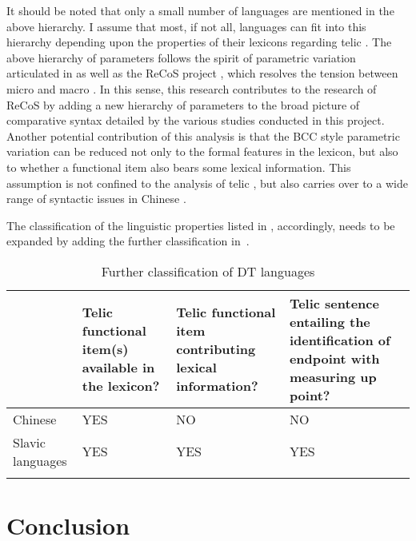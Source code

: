 \documentclass[output=paper]{langsci/langscibook}
\begin{document}
It should be noted that only a small number of languages are mentioned in the
above hierarchy. I assume that most, if not all, languages can fit into this
hierarchy depending upon the properties of their
lexicons regarding telic . The above hierarchy of
parameters follows the spirit of parametric variation articulated in
\textcite{RobHol2010} as well as the ReCoS project \citep{robertsonline}, which
resolves the tension between micro and macro . In this sense, this
research contributes to the research of ReCoS by adding a new hierarchy of
parameters to the broad picture of comparative syntax
detailed by the various studies conducted in this project.  Another potential
contribution of this analysis is that the
\gls{BCC} style parametric variation can be
reduced not only to the formal features in the lexicon, but also to whether a
functional item also bears some lexical information. This assumption is not
confined to the analysis of telic , but also carries over to a wide
range of syntactic issues in Chinese \citep[cf.][Ch.\
4]{huang2015syntactic,hu2018encoding}.


The classification of the linguistic properties listed in , accordingly,
needs to be expanded by adding the further classification in~\Cref{table:2}.

\begin{table}[ht]
{\small
\caption{Further classification of DT languages}
\begin{tabulary}{\textwidth}{lJJJ}
\lsptoprule
& Telic functional item(s) available in the lexicon? & Telic functional item contributing lexical information? & Telic sentence entailing the identification of endpoint with measuring up point? \\
\midrule
Chinese & YES & NO & NO \\
Slavic languages & YES & YES & YES\\
\lspbottomrule
\end{tabulary}
\label{table:2}
}
\end{table}

\section{Conclusion}
\end{document}
